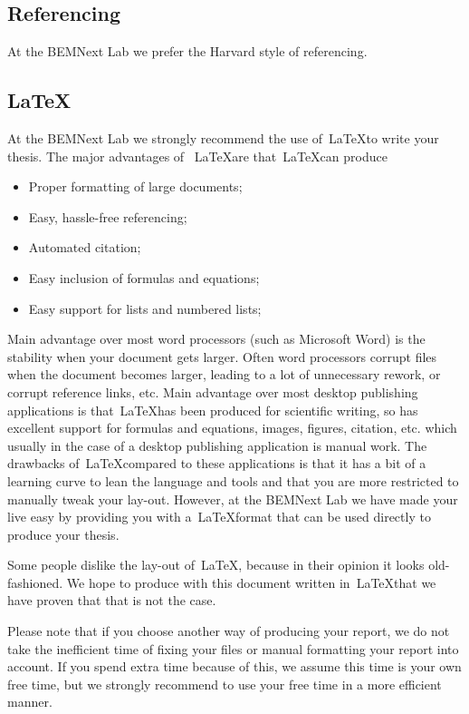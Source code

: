 \documentclass{latex-format/stylesheets/BEMNextstyle}
\begin{document}
\subsection*{Referencing}
At the BEMNext Lab we prefer the Harvard style of referencing.

\subsection*{\LaTeX}
At the BEMNext Lab we strongly recommend the use of~\LaTeX to write your thesis. The major advantages of ~\LaTeX are that~\LaTeX can produce 
\begin{itemize}
\item Proper formatting of large documents;
\item Easy, hassle-free referencing;
\item Automated citation;
\item Easy inclusion of formulas and equations;
\item Easy support for lists and numbered lists;
\end{itemize}

Main advantage over most word processors (such as Microsoft Word)  is the stability when your document gets larger. Often word processors corrupt files when the document becomes larger, leading to a lot of unnecessary rework, or corrupt reference links, etc. Main advantage over most desktop publishing applications is that~\LaTeX has been produced for scientific writing, so has excellent support for formulas and equations, images, figures, citation, etc. which usually in the case of a desktop publishing application is manual work.
The drawbacks of~\LaTeX compared to these applications is that it has a bit of a learning curve to lean the language and tools and that you are more restricted to manually tweak your lay-out.
However, at the BEMNext Lab we have made your live easy by providing you with a~\LaTeX format that can be used directly to produce your thesis.

Some people dislike the lay-out of~\LaTeX, because in their opinion it looks old-fashioned. We hope to produce with this document written in~\LaTeX that we have proven that that is not the case.

Please note that if you choose another way of producing your report, we do not take the inefficient time of fixing your files or manual formatting your report into account. If you spend extra time because of this, we assume this time is your own free time, but we strongly recommend to use your free time in a more efficient manner.
\end{document}
